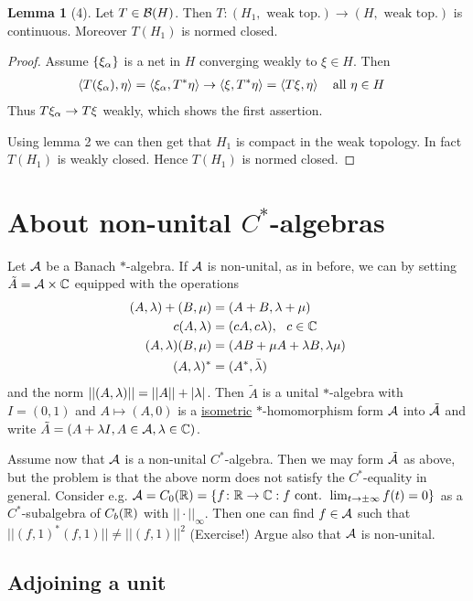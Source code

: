 \documentclass[10pt,english,a4paper]{article}
\theoremstyle{definition}
\newtheorem*{lemma}{Lemma}
\begin{document}
\begin{lemma}[4]
    Let $T \in \mathcal{B}(H)$. Then $T \colon (H_1 ,\text{ weak top.}) \to (H, \text{ weak top.})$
is continuous. Moreover $T(H_1)$ is normed closed.
\end{lemma}
\begin{proof}
    Assume $\{\xi_{\alpha}\}$ is a net in $H$ converging weakly to $\xi \in H$.
    Then
    \begin{align*}
        \left\langle T(\xi_{\alpha}),\eta \right\rangle &= \left\langle \xi_{\alpha}, T^*\eta \right\rangle \to
        \left\langle \xi,T^*\eta \right\rangle= \left\langle T\xi,\eta \right\rangle ~~\text{ all } \eta\in H 
    \end{align*}
    Thus $T\xi_{\alpha} \to T\xi$ weakly, which shows the first assertion.

    Using lemma 2 we can then get that $H_1$ is compact in the weak topology. 
    In fact $T(H_1)$ is weakly closed. Hence $T(H_1)$ is normed closed.  
\end{proof}


\section{About non-unital $C^*$-algebras}
Let $\mathcal{A}$ be a Banach $*$-algebra. If $\mathcal{A}$ is non-unital, as in before, we can 
 by setting $\tilde{A} = \mathcal{A}\times\mathbb{C}$ equipped 
with the operations 
\begin{align*}
    (A,\lambda) + (B,\mu) &= (A+B, \lambda+\mu) \\
    c(A,\lambda) &= (cA,c\lambda), ~~c \in \mathbb{C} \\
    (A,\lambda)(B,\mu) &= (AB + \mu A + \lambda B, \lambda\mu) \\
    (A,\lambda)^* &= (A^*, \bar{\lambda})
\end{align*}
and the norm $||(A,\lambda)|| = ||A|| + |\lambda|$.
Then $\tilde{A}$ is a unital $*$-algebra with $I = (0,1)$ and 
$A\mapsto (A,0)$ is a \ul{isometric} $*$-homomorphism form $\mathcal{A}$ into $\tilde{\mathcal{A}}$ 
and write $\tilde{A} = (A + \lambda I, A \in \mathcal{A}, \lambda \in \mathbb{C})$.

Assume now that $\mathcal{A}$ is a non-unital $C^*$-algebra. Then we may form $\tilde{\mathcal{A}}$
as above, but the problem is that the above norm does not satisfy the $C^*$-equality
in general. Consider e.g. $\mathcal{A} = C_{0}(\mathbb{R}) = \{f \colon \mathbb{R} \to \mathbb{C} : f \text{
cont. } \lim_{t\to\pm\infty}f(t) =0\}$ as a $C^*$-subalgebra of $C_b(\mathbb{R})$ with
$||\cdot||_{\infty}$.
Then one can find $f \in \mathcal{A}$ such that $||(f,1)^*(f,1)|| \neq ||(f,1)||^2$ (Exercise!)
Argue also that $\mathcal{A}$ is non-unital.

\subsection{Adjoining a unit}
\end{document}
